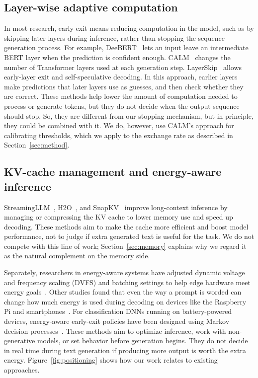 \documentclass[review,12pt]{elsarticle}
\begin{document}
\subsection{Layer-wise adaptive computation}
In most research, early exit means reducing computation in the model, such as by skipping later layers during inference, rather than stopping the sequence generation process. For example, DeeBERT~\cite{xin2020deebert} lets an input leave an intermediate BERT layer when the prediction is confident enough. CALM~\cite{schuster2022calm} changes the number of Transformer layers used at each generation step.
LayerSkip~\cite{elhoushi2024layerskip} allows early-layer exit and self-speculative decoding. In this approach, earlier layers make predictions that later layers use as guesses, and then check whether they are correct. These methods help lower
the amount of computation needed to process or generate tokens, but they do not
decide when the output sequence should stop. So, they are
different from our stopping mechanism, but in principle, they could be combined
with it. We do, however, use CALM's approach for calibrating
thresholds, which we apply to the exchange rate as described in
Section~\ref{sec:method}.

\subsection{KV-cache management and energy-aware inference}
StreamingLLM~\cite{xiao2024streamingllm}, H2O~\cite{zhang2023h2o}, and SnapKV~\cite{li2024snapkv} improve long-context inference by managing or compressing the KV cache to lower memory use and speed up decoding. These methods aim to make the cache more efficient and boost model performance, not to judge if extra generated text is useful for the task. We do not compete with this line of work;
Section~\ref{sec:memory} explains why we regard it as the natural
complement on the memory side. \par

Separately, researchers in energy-aware systems have adjusted dynamic voltage and frequency scaling (DVFS) and batching settings to help edge hardware meet energy goals~\cite{maliakel2025dvfs}. Other studies found that even the way a prompt is worded can change how much energy is used during decoding on devices like the Raspberry Pi and smartphones~\cite{tao2026keyword}. For classification DNNs running on battery-powered devices, energy-aware early-exit policies have been designed using Markov decision processes~\cite{bullo2023sustainable}. These methods aim to optimize inference, work with non-generative models, or set behavior before generation begins. They do not decide in real time during text generation if producing more output is worth the extra energy. Figure~\ref{fig:positioning} shows how our work relates to existing approaches.
\end{document}
